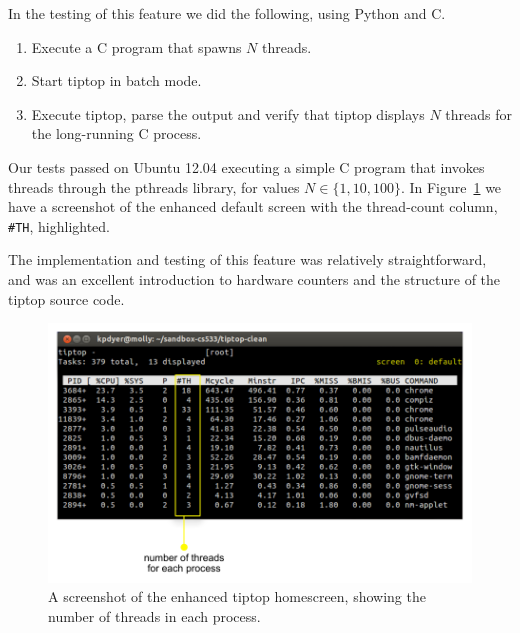 In the testing of this feature we did the following, using Python and C.
\begin{enumerate}
\item Execute a C program that spawns $N$ threads.
\item Start tiptop in batch mode.
\item Execute tiptop, parse the output and verify that tiptop displays $N$ threads for the long-running C process.
\end{enumerate}

Our tests passed on Ubuntu 12.04 executing a simple C program that invokes threads through the pthreads library, for values $N\in\{1,10,100\}$.
In Figure~\ref{fig:tiptop-threads} we have a screenshot of the enhanced default screen with the thread-count column, \texttt{\#TH}, highlighted.

The implementation and testing of this feature was relatively straightforward, and was an excellent introduction to hardware counters and the structure of the tiptop source code.

\begin{figure}[t]
\footnotesize
\centering
\includegraphics[width=.7\textwidth]{tiptop-threads}
\caption{\footnotesize A screenshot of the enhanced tiptop homescreen, showing the number of threads in each process.}
\label{fig:tiptop-threads}
\end{figure}

